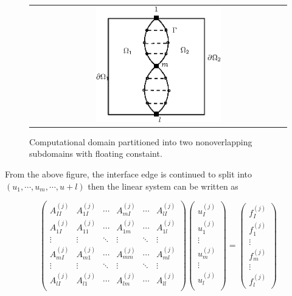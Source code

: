 \begin{figure}[h]
	\centering
	\begin{tabular}{c}
		\includegraphics[width=0.5\textwidth]{./pics/feti2}
	\end{tabular}
	\caption{\footnotesize Computational domain partitioned into two nonoverlapping subdomains with floating constaint.}
\end{figure}

From the above figure, the interface edge is continued to split into $ (u_1, \cdots, u_m, \cdots, u+l) $ then the linear system can be written as

\begin{equation}
\begin{pmatrix}
A_{II}^{(j)} & A_{1I}^{(j)} & \cdots & A_{mI}^{(j)} & \cdots & A_{l I}^{(j)} \\
A_{1 I}^{(j)} & A_{11}^{(j)} & \cdots & A_{1m}^{(j)} & \cdots & A_{1l}^{(j)} \\
\vdots & \vdots & \ddots & \vdots & \ddots & \vdots \\
A_{mI}^{(j)} & A_{m1}^{(j)} & \cdots & A_{mm}^{(j)} & \cdots & A_{ml}^{(j)} \\
\vdots & \vdots & \ddots & \vdots & \ddots & \vdots \\
A_{lI}^{(j)} & A_{l1}^{(j)} & \cdots & A_{lm}^{(j)} & \cdots & A_{ll}^{(j)}\\
\end{pmatrix} \begin{pmatrix}
u_{I}^{(j)} \\ u_{1}^{(j)} \\ \vdots \\ u_{m}^{(j)} \\ \vdots \\ u_{l}^{(j)}\\
\end{pmatrix} = \begin{pmatrix}
f_{I}^{(j)} \\ f_{1}^{(j)} \\ \vdots \\ f_{m}^{(j)} \\ \vdots \\ f_{l}^{(j)}
\end{pmatrix}
\end{equation}

